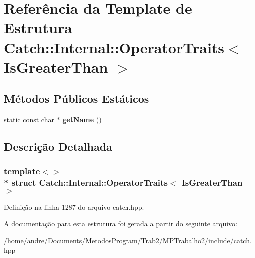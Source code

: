 \hypertarget{structCatch_1_1Internal_1_1OperatorTraits_3_01IsGreaterThan_01_4}{}\section{Referência da Template de Estrutura Catch\+:\+:Internal\+:\+:Operator\+Traits$<$ Is\+Greater\+Than $>$}
\label{structCatch_1_1Internal_1_1OperatorTraits_3_01IsGreaterThan_01_4}
\subsection*{Métodos Públicos Estáticos}
\begin{DoxyCompactItemize}
\item 
static const char $\ast$ {\bfseries get\+Name} ()\hypertarget{structCatch_1_1Internal_1_1OperatorTraits_3_01IsGreaterThan_01_4_ab917bfb9ccbe461dc684ee5a34d67d27}{}\label{structCatch_1_1Internal_1_1OperatorTraits_3_01IsGreaterThan_01_4_ab917bfb9ccbe461dc684ee5a34d67d27}

\end{DoxyCompactItemize}


\subsection{Descrição Detalhada}
\subsubsection*{template$<$$>$\\*
struct Catch\+::\+Internal\+::\+Operator\+Traits$<$ Is\+Greater\+Than $>$}



Definição na linha 1287 do arquivo catch.\+hpp.



A documentação para esta estrutura foi gerada a partir do seguinte arquivo\+:\begin{DoxyCompactItemize}
\item 
/home/andre/\+Documents/\+Metodos\+Program/\+Trab2/\+M\+P\+Trabalho2/include/catch.\+hpp\end{DoxyCompactItemize}
